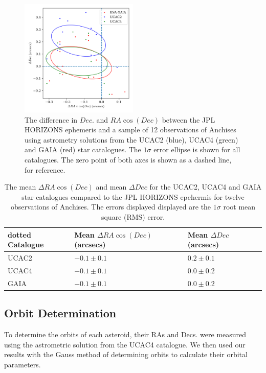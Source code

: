 \documentclass[10pt, twocolumn]{revtex4}    %
\begin{document}
\begin{figure}[h!]
\centering
\includegraphics[width=0.5\textwidth]{20180330_165134_ASTROM_COMPARE}
\caption{The difference in $Dec.$ and $RA\cos(Dec)$ between the JPL HORIZONS ephemeris and a sample of 12 observations of Anchises using astrometry solutions from the UCAC2 (blue), UCAC4 (green) and GAIA (red) star catalogues. The $1\sigma$ error ellipse is shown for all catalogues. The zero point of both axes is shown as a dashed line, for reference.}
\label{fig: astrom compare}
\end{figure}

\begin{table}[h!]
\centering
\begin{tabularx}{0.5\textwidth}{ Y Y Y }
\hhline{===}dotted
Catalogue & Mean $\Delta RA \cos (Dec)$ (arcsecs) & Mean $\Delta Dec$ (arcsecs) \\[3pt] \hline
UCAC2 & $-0.1 \pm 0.1$ & $0.2 \pm 0.1$ \\[3pt]
UCAC4 & $-0.1 \pm 0.1$ & $0.0 \pm 0.2$ \\[3pt]
GAIA & $-0.1 \pm 0.1$ & $0.0 \pm 0.2$ \\[3pt] \hline
\end{tabularx}
\caption{The mean $\Delta RA \cos (Dec)$ and mean $\Delta Dec$ for the UCAC2, UCAC4 and GAIA star catalogues compared to the JPL HORIZONS epehermis for twelve observations of Anchises. The errors displayed displayed are the $1\sigma$ root mean square (RMS) error.}
\label{tab: astrom compare results}
\end{table}


\subsection*{Orbit Determination}

To determine the orbits of each asteroid, their RAs and Decs. were measured using the astrometric solution from the UCAC4 catalogue. We then used our results with the Gauss method of determining orbits to calculate their orbital parameters.
\end{document}

